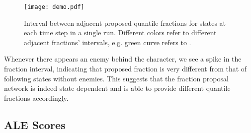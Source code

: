 \documentclass{article}
\begin{document}
\begin{figure*}[htb!]
    \centering
    \texttt{[image: demo.pdf]}
    \caption{Interval between adjacent proposed quantile fractions for states at each time step in a single run. Different colors refer to different adjacent fractions' intervals, e.g. green curve refers to .}
    \label{demo}
\end{figure*}

Whenever there appears an enemy behind the character, we see a spike in the fraction interval, indicating that proposed fraction is very different from that of following states without enemies. This suggests that the fraction proposal network is indeed state dependent and is able to provide different quantile fractions accordingly.

\newpage
\subsection*{ALE Scores}
\end{document}
